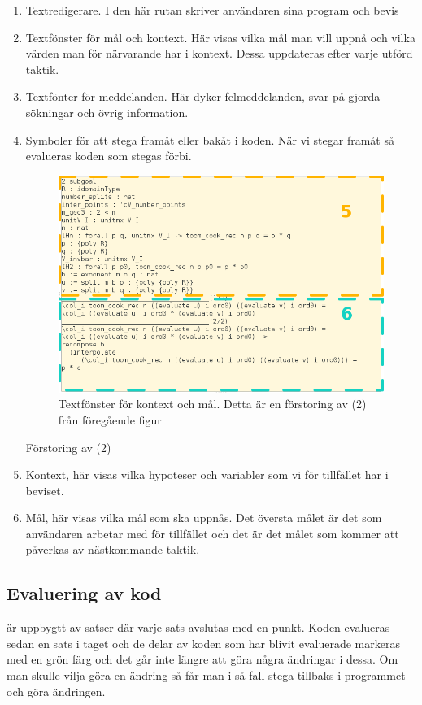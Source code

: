 \begin{enumerate}
\item Textredigerare. I den här rutan skriver användaren sina program och bevis
\item Textfönster för mål och kontext. Här visas vilka mål man vill uppnå och
  vilka värden man för närvarande har i kontext. Dessa uppdateras efter varje
  utförd taktik.
\item Textfönter för meddelanden. Här dyker felmeddelanden, svar på
  gjorda sökningar och övrig information.
\item Symboler för att stega framåt eller bakåt i koden. När vi stegar framåt
  så evalueras koden som stegas förbi.


\begin{figure}[h!]
  \centering
  \includegraphics[width=150mm]{images/Kontext}
  \caption[Fönster för kontext och mål]
   {Textfönster för kontext och mål. Detta är en förstoring av (2) från
     föregående figur}
\end{figure}

Förstoring av (2)
\item Kontext, här visas vilka hypoteser och variabler som vi för tillfället
  har i beviset.
\item Mål, här visas vilka mål som ska uppnås. Det översta målet är det som
  användaren arbetar med för tillfället och det är det målet som kommer att
  påverkas av nästkommande taktik.
\end{enumerate}

\subsection{Evaluering av kod}
\coq är uppbygtt av satser där varje sats avslutas med en punkt. Koden
evalueras sedan en sats i taget och de delar av koden som har blivit evaluerade
markeras med en grön färg och det går inte längre att göra några ändringar i
dessa. Om man skulle vilja göra en ändring så får man i så fall stega tillbaks
i programmet och göra ändringen.


